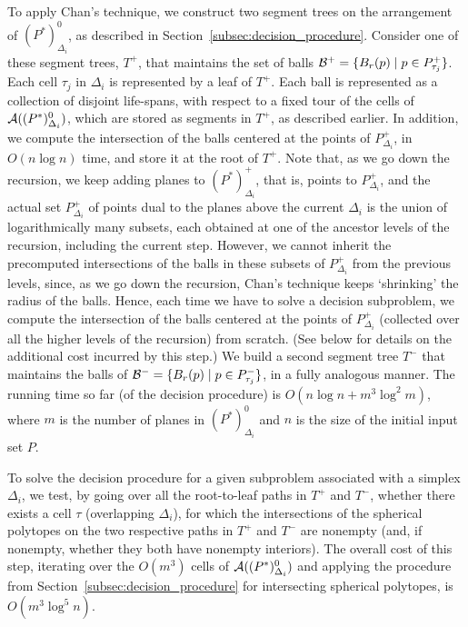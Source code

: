 \documentclass[a4paper,12pt]{article}
\def\A{{\cal A}}
\def\B{{\cal B}}
\begin{document}
To apply Chan's technique, we construct two segment trees on the
arrangement of $(P^*)_{\Delta_i}^0$, as described in Section~\ref{subsec:decision_procedure}. Consider one of these segment trees, $T^+$,
that maintains the set of balls $\B^+ = \{B_r(p) \mid p \in
P_{\tau_j}^+\}$. Each cell $\tau_j$ in $\Delta_i$ is represented by a
leaf of $T^+$. Each ball is represented as a collection of disjoint
life-spans, with respect to a fixed tour of the cells of $\A((P^*)_{\Delta_i}^0)$,
which are stored as segments in $T^+$, as described earlier.
In addition, we compute the intersection of the balls centered
at the points of $P_{\Delta_i}^+$, in $O(n \log n)$ time, and store it at
the root of $T^+$. Note that, as we go down the recursion, we keep
adding planes to $(P^*)_{\Delta_i}^+$, that is, points to $P_{\Delta_i}^+$, and the
actual set $P_{\Delta_i}^+$ of points dual to the planes above the
current $\Delta_i$ is the union of logarithmically many subsets, each
obtained at one of the ancestor levels of the recursion, including the current step.
However, we cannot inherit the precomputed intersections of the balls
in these subsets of $P_{\Delta_i}^+$ from the previous levels, since, as we go down the
recursion, Chan's technique keeps `shrinking' the radius of the balls. Hence, each
time we have to solve a decision subproblem, we compute the
intersection of the balls centered at the points of $P_{\Delta_i}^+$
(collected over all the higher levels of the recursion)
from scratch. (See below for details on the additional cost incurred
by this step.) We build a second segment tree $T^-$
that maintains the balls of $\B^- = \{B_r(p) \mid p \in
P_{\tau_j}^-\}$, in a fully analogous manner. The running time so far (of the decision procedure)
is $O(n \log n + m^3 \log^2 m)$, where $m$ is the
number of planes in $(P^*)_{\Delta_i}^0$ and $n$ is the size of the
initial input set $P$.

To solve the decision procedure for a given subproblem associated
with a simplex $\Delta_i$, we test, by going over all the
root-to-leaf paths in $T^+$ and $T^-$, whether there exists a cell
$\tau$ (overlapping $\Delta_i$), for which the intersections of the
spherical polytopes on the two respective paths in $T^+$ and $T^-$
are nonempty (and, if nonempty, whether they both have nonempty
interiors). The overall cost of this step, iterating over the
$O(m^3)$ cells of $\A((P^*)_{\Delta_i}^0)$ and applying the
procedure from Section~\ref{subsec:decision_procedure} for
intersecting spherical polytopes, is $O(m^3 \log^5 n)$.
\end{document}
